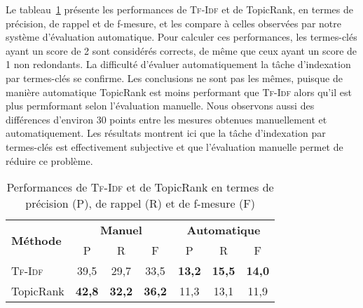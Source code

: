         Le
        tableau~\ref{tab:main-automatic_evaluation_of_keyphrase_annotation-results-topicrank-prf}
        présente les performances de \textsc{Tf-Idf} et de TopicRank, en termes
        de précision, de rappel et de f-mesure, et les compare à celles
        observées par notre système d'évaluation automatique. Pour calculer ces
        performances, les termes-clés ayant un score de 2 sont considérés
        corrects, de même que ceux ayant un score de 1 non redondants. La
        difficulté d'évaluer automatiquement la tâche d'indexation par
        termes-clés se confirme. Les conclusions ne sont pas les mêmes, puisque
        de manière automatique TopicRank est moins performant que
        \textsc{Tf-Idf} alors qu'il est plus permformant selon l'évaluation
        manuelle. Nous observons aussi des différences d'environ 30 points entre
        les mesures obtenues manuellement et automatiquement. Les résultats
        montrent ici que la tâche d'indexation par termes-clés est effectivement
        subjective et que l'évaluation manuelle permet de réduire ce problème.
        \begin{table}[h!]
          \centering
          \begin{tabular}{l|ccc|ccc}
            \toprule
            \multirow{2}{*}{\textbf{Méthode}} & \multicolumn{3}{c|}{\textbf{Manuel}} & \multicolumn{3}{c}{\textbf{Automatique}}\\
            \cline{2-7}
            & P & R & F & P & R & F\\
            \hline
            \textsc{Tf-Idf} & 39,5 & 29,7 & 33,5 & \textbf{13,2} & \textbf{15,5} & \textbf{14,0}\\
            TopicRank & \textbf{42,8} & \textbf{32,2} & \textbf{36,2} & 11,3 & 13,1 & 11,9\\
            \bottomrule
          \end{tabular}
          \caption[
            Performances de \textsc{Tf-Idf} et de TopicRank en termes de
            précision, de rappel et de f-mesure
          ]{
            Performances de \textsc{Tf-Idf} et de TopicRank en termes de
            précision (P), de rappel (R) et de f-mesure (F)
            \label{tab:main-automatic_evaluation_of_keyphrase_annotation-results-topicrank-prf}}
        \end{table}
      
